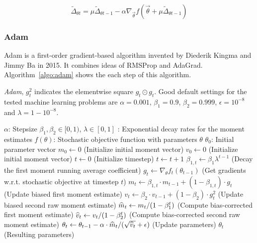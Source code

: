 \documentclass[officiallayout]{tktla}
\begin{document}
\begin{equation}
\widetilde{\Delta}_{\theta t} =  \mu \widetilde{\Delta}_{\theta {t-1}}  -\alpha \nabla_{\vec{\theta}} f(\vec{\theta} + \mu \widetilde{\Delta}_{\theta {t-1}})
\label{nag}
\end{equation}

\subsubsection{Adam}
Adam is a first-order gradient-based algorithm \cite{kingma2014adam} invented by 	Diederik Kingma and Jimmy Ba in 2015. It combines ideas of RMSProp and AdaGrad. Algorithm~\ref{algo:adam} shows the each step of this algorithm.

\begin{algorithm}[ht]
\caption{\emph{Adam}, $g^2_t$ indicates the elementwise square $g_t \odot g_t$. Good default settings for the tested machine learning problems are $\alpha=0.001$, $\beta_1=0.9$, $\beta_2=0.999$, $\epsilon = 10^{-8}$ and $\lambda = 1-10^{-8}$.}
\label{algo:adam}
\begin{algorithmic}
\REQUIRE $\alpha$: Stepsize
\REQUIRE $\beta_1,\beta_2\in [0,1)$, $\lambda\in[0,1]$ : Exponential decay rates for the moment estimates
\REQUIRE $f(\theta)$: Stochastic objective function with parameters $\theta$
\REQUIRE $\theta_0$: Initial parameter vector
\STATE $m_0 \gets 0$ (Initialize initial  moment vector)
\STATE $v_0 \gets 0$ (Initialize initial  moment vector)
\STATE $t \gets 0$ (Initialize timestep)
\STATE $t \gets t + 1$
\STATE $\beta_{1,t} \gets \beta_1\lambda^{t-1}$ (Decay the first moment running average coefficient)
\STATE $g_t \gets \nabla_{\theta} f_t(\theta_{t-1})$ (Get gradients w.r.t. stochastic objective at timestep $t$)
\STATE $m_t \gets \beta_{1,t} \cdot m_{t-1} + (1-\beta_{1,t}) \cdot g_t$ (Update biased first moment estimate)
\STATE $v_t \gets \beta_2 \cdot v_{t-1} + (1-\beta_2) \cdot g^2_t$ (Update biased second raw moment estimate)
\STATE $\widehat{m}_t \gets m_t / (1-\beta_1^t)$ (Compute bias-corrected first moment estimate)
\STATE $\widehat{v}_t \gets v_t / (1-\beta_2^t)$ (Compute bias-corrected second raw moment estimate)
\STATE $\theta_t \gets \theta_{t-1} - \alpha \cdot \widehat{m}_t / (\sqrt{\widehat{v}_t} + \epsilon)$ (Update parameters)
\ENDWHILE
\RETURN $\theta_t$ (Resulting parameters)
\end{algorithmic}
\vspace{-0.05in}
\end{algorithm}
\end{document}
